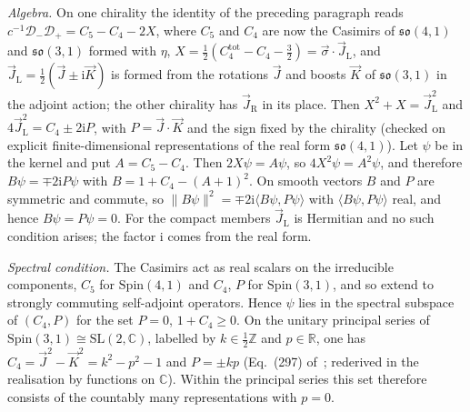 \emph{Algebra.} On one chirality the identity of the preceding paragraph reads \(c^{-1}\mathcal D_-\mathcal D_+=C_5-C_4-2X\), where \(C_5\) and \(C_4\) are now the Casimirs of \(\mathfrak{so}(4,1)\) and \(\mathfrak{so}(3,1)\) formed with \(\eta\), \(X=\tfrac12(C_4^{\mathrm{tot}}-C_4-\tfrac32)=\vec\sigma\cdot\vec J_{\mathrm L}\), and \(\vec J_{\mathrm L}=\tfrac12(\vec J\pm\mathrm i\vec K)\) is formed from the rotations \(\vec J\) and boosts \(\vec K\) of \(\mathfrak{so}(3,1)\) in the adjoint action; the other chirality has \(\vec J_{\mathrm R}\) in its place. Then \(X^2+X=\vec J_{\mathrm L}^2\) and \(4\vec J_{\mathrm L}^2=C_4\pm2\mathrm iP\), with \(P=\vec J\cdot\vec K\) and the sign fixed by the chirality (checked on explicit finite-dimensional representations of the real form \(\mathfrak{so}(4,1)\)). Let \(\psi\) be in the kernel and put \(A=C_5-C_4\). Then \(2X\psi=A\psi\), so \(4X^2\psi=A^2\psi\), and therefore \(B\psi=\mp2\mathrm iP\psi\) with \(B=1+C_4-(A+1)^2\). On smooth vectors \(B\) and \(P\) are symmetric and commute, so \(\|B\psi\|^2=\mp2\mathrm i\langle B\psi,P\psi\rangle\) with \(\langle B\psi,P\psi\rangle\) real, and hence \(B\psi=P\psi=0\). For the compact members \(\vec J_{\mathrm L}\) is Hermitian and no such condition arises; the factor \(\mathrm i\) comes from the real form.

\emph{Spectral condition.} The Casimirs act as real scalars on the irreducible components, \(C_5\) for \(\mathrm{Spin}(4,1)\) and \(C_4\), \(P\) for \(\mathrm{Spin}(3,1)\), and so extend to strongly commuting self-adjoint operators. Hence \(\psi\) lies in the spectral subspace of \((C_4,P)\) for the set \(P=0\), \(1+C_4\ge0\). On the unitary principal series of \(\mathrm{Spin}(3,1)\cong\mathrm{SL}(2,\mathbb C)\), labelled by \(k\in\tfrac12\mathbb Z\) and \(p\in\mathbb R\), one has \(C_4=\vec J^2-\vec K^2=k^2-p^2-1\) and \(P=\pm kp\) (Eq.~(297) of~\cite{MartinDussaud2019}; rederived in the realisation by functions on \(\mathbb C\)). Within the principal series this set therefore consists of the countably many representations with \(p=0\).

